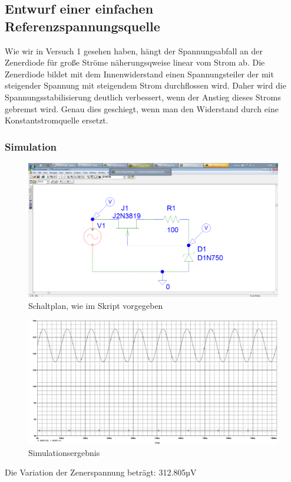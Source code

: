 \subsection{Entwurf einer einfachen Referenzspannungsquelle}
Wie wir in Versuch 1 gesehen haben, hängt der Spannungsabfall an der Zenerdiode für große Ströme näherungsqweise linear vom Strom ab. Die Zenerdiode bildet mit dem Innenwiderstand einen Spannungsteiler der mit steigender Spannung mit steigendem Strom durchflossen wird. Daher wird die Spannungsstabilisierung deutlich verbessert, wenn der Anstieg dieses Stroms gebremst wird. Genau dies geschiegt, wenn man den Widerstand durch eine Konstantstromquelle ersetzt.
\subsubsection*{Simulation}
\begin{figure}[H]
	\centering
	\includegraphics[width=\linewidth]{versuch7/spice/s7311.png}
	\caption{Schaltplan, wie im Skript vorgegeben}
\end{figure}
\begin{figure}[H]
	\centering
	\includegraphics[width=\linewidth]{versuch7/spice/7311.png}
	\caption{Simulationsergebnis}
\end{figure}
Die Variation der Zenerspannung beträgt: 312.805µV
